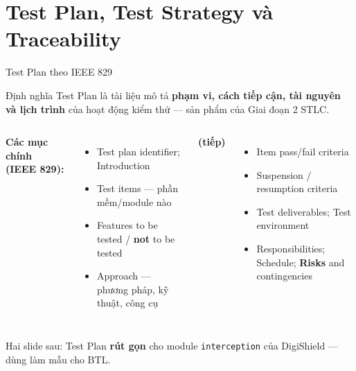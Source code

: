 \documentclass[aspectratio=169,12pt]{beamer}
\begin{document}
\section{Test Plan, Test Strategy và Traceability}

\begin{frame}{Test Plan theo IEEE 829}
  \begin{block}{Định nghĩa \cite{ieee829}}
    Test Plan là tài liệu mô tả \textbf{phạm vi, cách tiếp cận, tài nguyên và lịch trình}
    của hoạt động kiểm thử --- sản phẩm của Giai đoạn 2 STLC.
  \end{block}

  \vspace{0.1em}
  \begin{columns}[T]
    \textbf{Các mục chính (IEEE 829):}
    \begin{itemize}
      \item Test plan identifier; Introduction
      \item Test items --- phần mềm/module nào
      \item Features to be tested / \textbf{not} to be tested
      \item Approach --- phương pháp, kỹ thuật, công cụ
    \end{itemize}
    \textbf{(tiếp)}
    \begin{itemize}
      \item Item pass/fail criteria
      \item Suspension / resumption criteria
      \item Test deliverables; Test environment
      \item Responsibilities; Schedule; \textbf{Risks} and contingencies
    \end{itemize}
  \end{columns}

  \vspace{0.1em}
  \small Hai slide sau: Test Plan \textbf{rút gọn} cho module \texttt{interception}
  của DigiShield --- dùng làm mẫu cho BTL.
\end{frame}
\end{document}
